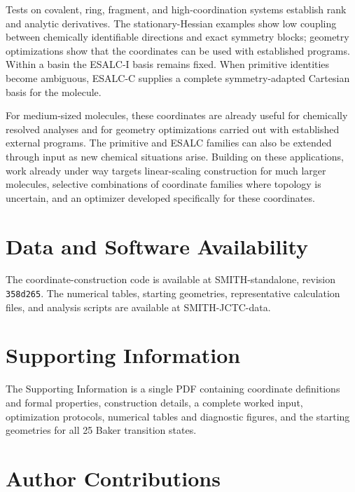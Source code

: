 \documentclass[journal=jctcce,manuscript=article,layout=traditional]{achemso}
\providecommand{\href}[2]{#2}
\theoremstyle{definition}
\begin{document}
{Tests on covalent, ring, fragment, and high-coordination systems establish
rank and analytic derivatives. The stationary-Hessian examples show low
coupling between chemically identifiable directions and exact symmetry
blocks; geometry optimizations show that the coordinates can be used with
established programs. Within a basin the ESALC-I basis remains fixed. When
primitive identities become ambiguous, ESALC-C supplies a complete
symmetry-adapted Cartesian basis for the molecule.}

{For medium-sized molecules, these coordinates are already useful for
chemically resolved analyses and for geometry optimizations carried out
with established external programs. The primitive and ESALC families can
also be extended through input as new chemical situations arise. Building
on these applications, work already under way targets linear-scaling
construction for much larger molecules, selective combinations of
coordinate families where topology is uncertain, and an optimizer
developed specifically for these coordinates.}

\section*{Data and Software Availability}

\begin{sloppypar}
{The coordinate-construction code is available at
\href{https://github.com/yogibubu/SMITH-standalone/tree/358d26537535c6f2510231b51beccb595d3dc829}{SMITH-standalone, revision \texttt{358d265}}. The numerical tables, starting geometries, representative calculation files, and analysis scripts are available at
\href{https://github.com/yogibubu/SMITH-JCTC-data}{SMITH-JCTC-data}.}
\end{sloppypar}

\section*{Supporting Information}

{The Supporting Information is a single PDF containing
coordinate definitions and formal properties, construction details, a
complete worked input, optimization protocols, numerical tables and
diagnostic figures, and the starting geometries for all 25 Baker transition
states.}

\section*{Author Contributions}
\end{document}
